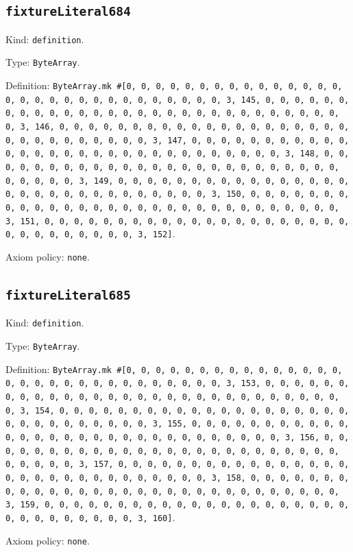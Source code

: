 \documentclass[11pt]{article}
\begin{document}
\subsection*{\texttt{fixtureLiteral684}}
\noindent Kind: \texttt{definition}.\par
\noindent Type: \texttt{ByteArray}.\par
\noindent Definition: \texttt{ByteArray.mk \#[0, 0, 0, 0, 0, 0, 0, 0, 0, 0, 0, 0, 0, 0, 0, 0, 0, 0, 0, 0, 0, 0, 0, 0, 0, 0, 0, 0, 0, 0, 3, 145, 0, 0, 0, 0, 0, 0, 0, 0, 0, 0, 0, 0, 0, 0, 0, 0, 0, 0, 0, 0, 0, 0, 0, 0, 0, 0, 0, 0, 0, 0, 3, 146, 0, 0, 0, 0, 0, 0, 0, 0, 0, 0, 0, 0, 0, 0, 0, 0, 0, 0, 0, 0, 0, 0, 0, 0, 0, 0, 0, 0, 0, 0, 3, 147, 0, 0, 0, 0, 0, 0, 0, 0, 0, 0, 0, 0, 0, 0, 0, 0, 0, 0, 0, 0, 0, 0, 0, 0, 0, 0, 0, 0, 0, 0, 3, 148, 0, 0, 0, 0, 0, 0, 0, 0, 0, 0, 0, 0, 0, 0, 0, 0, 0, 0, 0, 0, 0, 0, 0, 0, 0, 0, 0, 0, 0, 0, 3, 149, 0, 0, 0, 0, 0, 0, 0, 0, 0, 0, 0, 0, 0, 0, 0, 0, 0, 0, 0, 0, 0, 0, 0, 0, 0, 0, 0, 0, 0, 0, 3, 150, 0, 0, 0, 0, 0, 0, 0, 0, 0, 0, 0, 0, 0, 0, 0, 0, 0, 0, 0, 0, 0, 0, 0, 0, 0, 0, 0, 0, 0, 0, 3, 151, 0, 0, 0, 0, 0, 0, 0, 0, 0, 0, 0, 0, 0, 0, 0, 0, 0, 0, 0, 0, 0, 0, 0, 0, 0, 0, 0, 0, 0, 0, 3, 152]}.\par
\noindent Axiom policy: \texttt{none}.\par
\subsection*{\texttt{fixtureLiteral685}}
\noindent Kind: \texttt{definition}.\par
\noindent Type: \texttt{ByteArray}.\par
\noindent Definition: \texttt{ByteArray.mk \#[0, 0, 0, 0, 0, 0, 0, 0, 0, 0, 0, 0, 0, 0, 0, 0, 0, 0, 0, 0, 0, 0, 0, 0, 0, 0, 0, 0, 0, 0, 3, 153, 0, 0, 0, 0, 0, 0, 0, 0, 0, 0, 0, 0, 0, 0, 0, 0, 0, 0, 0, 0, 0, 0, 0, 0, 0, 0, 0, 0, 0, 0, 3, 154, 0, 0, 0, 0, 0, 0, 0, 0, 0, 0, 0, 0, 0, 0, 0, 0, 0, 0, 0, 0, 0, 0, 0, 0, 0, 0, 0, 0, 0, 0, 3, 155, 0, 0, 0, 0, 0, 0, 0, 0, 0, 0, 0, 0, 0, 0, 0, 0, 0, 0, 0, 0, 0, 0, 0, 0, 0, 0, 0, 0, 0, 0, 3, 156, 0, 0, 0, 0, 0, 0, 0, 0, 0, 0, 0, 0, 0, 0, 0, 0, 0, 0, 0, 0, 0, 0, 0, 0, 0, 0, 0, 0, 0, 0, 3, 157, 0, 0, 0, 0, 0, 0, 0, 0, 0, 0, 0, 0, 0, 0, 0, 0, 0, 0, 0, 0, 0, 0, 0, 0, 0, 0, 0, 0, 0, 0, 3, 158, 0, 0, 0, 0, 0, 0, 0, 0, 0, 0, 0, 0, 0, 0, 0, 0, 0, 0, 0, 0, 0, 0, 0, 0, 0, 0, 0, 0, 0, 0, 3, 159, 0, 0, 0, 0, 0, 0, 0, 0, 0, 0, 0, 0, 0, 0, 0, 0, 0, 0, 0, 0, 0, 0, 0, 0, 0, 0, 0, 0, 0, 0, 3, 160]}.\par
\noindent Axiom policy: \texttt{none}.\par
\end{document}
